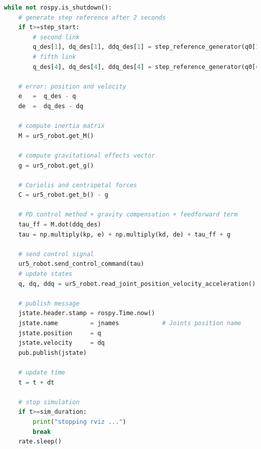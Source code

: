 \begin{lstlisting}[language=Python,caption={Move the second and fifth joint of UR5 robot with the requirement motion of activity 1.7.2}, label={lst:joint_PD_gravity_feedforward_step}]
while not rospy.is_shutdown():
    # generate step reference after 2 seconds
    if t>=step_start:
        # second link
        q_des[1], dq_des[1], ddq_des[1] = step_reference_generator(q0[1], -0.4)
        # fifth link
        q_des[4], dq_des[4], ddq_des[4] = step_reference_generator(q0[4], 0.5)

    # error: position and velocity
    e 	=  q_des - q
    de 	=  dq_des - dq    
    
    # compute inertia matrix
    M = ur5_robot.get_M()

    # compute gravitational effects vector
    g = ur5_robot.get_g()

    # Coriolis and centripetal forces
    C = ur5_robot.get_b() - g

    # PD control method + gravity compensation + feedforward term
    tau_ff = M.dot(ddq_des)
    tau = np.multiply(kp, e) + np.multiply(kd, de) + tau_ff + g
    
    # send control signal
    ur5_robot.send_control_command(tau)
    # update states
    q, dq, ddq = ur5_robot.read_joint_position_velocity_acceleration()

    # publish message
    jstate.header.stamp = rospy.Time.now()
    jstate.name 		= jnames			# Joints position name
    jstate.position 	= q
    jstate.velocity 	= dq
    pub.publish(jstate)

    # update time
    t = t + dt
   
    # stop simulation
    if t>=sim_duration:
        print("stopping rviz ...")
        break
    rate.sleep()
\end{lstlisting}

